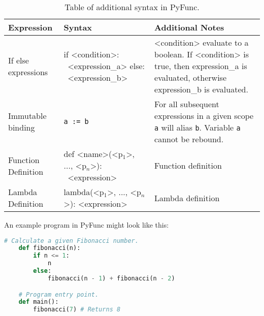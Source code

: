 \documentclass{l4proj}
\begin{document}
\begin{table}[!h]
    \caption{Table of additional syntax in PyFunc.}
    \begin{center}

    \begin{tabular}{@{}|l|p{5cm}|p{4cm}|@{}}
        \hline
        \textbf{Expression}  &   \textbf{Syntax}     &   \textbf{Additional Notes}   \\
        \hline
        \hline
        If else expressions & if <condition>: \newline \-\ <expression\_a> \newline else: \newline \-\ <expression\_b> & <condition> evaluate to a boolean. If <condition> is true, then expression\_a is evaluated, otherwise expression\_b is evaluated.\\
        \hline
        Immutable binding   & \texttt{a := b}   & For all subsequent expressions in a given scope \texttt{a} will alias \texttt{b}. Variable \texttt{a} cannot be rebound. \\
        \hline
        Function Definition & def <name>(<p$_1$>, ..., <p$_n$>): \newline \-\ <expression> & Function definition\\
        \hline
        Lambda Definition & lambda(<p$_1$>, ..., <p$_n$>): <expression> & Lambda definition \\
        \hline
        
    \end{tabular}
    \end{center}
\end{table}

An example program in PyFunc might look like this:
\begin{lstlisting}[language=python, caption={The simple recursive function to calculate a given fibonacci number.}, label=lst:callahan]
    # Calculate a given Fibonacci number.
    def fibonacci(n):
        if n <= 1:
            n
        else:
            fibonacci(n - 1) + fibonacci(n - 2)

    # Program entry point.
    def main():
        fibonacci(7) # Returns 8
\end{lstlisting}
\end{document}
